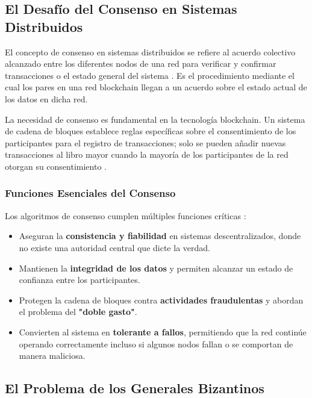 \documentclass[spanish,12pt,letterpaper]{report}
\begin{document}
\subsection{El Desafío del Consenso en Sistemas Distribuidos}

El concepto de consenso en sistemas distribuidos se refiere al acuerdo colectivo alcanzado entre los diferentes nodos de una red para verificar y confirmar transacciones o el estado general del sistema \parencite{crypto2025consensus}. Es el procedimiento mediante el cual los pares en una red blockchain llegan a un acuerdo sobre el estado actual de los datos en dicha red.

La necesidad de consenso es fundamental en la tecnología blockchain. Un sistema de cadena de bloques establece reglas específicas sobre el consentimiento de los participantes para el registro de transacciones; solo se pueden añadir nuevas transacciones al libro mayor cuando la mayoría de los participantes de la red otorgan su consentimiento \parencite{aws2025blockchain}.

\subsubsection{Funciones Esenciales del Consenso}

Los algoritmos de consenso cumplen múltiples funciones críticas \parencite{crypto2025consensus}:

\begin{itemize}
    \item Aseguran la \textbf{consistencia y fiabilidad} en sistemas descentralizados, donde no existe una autoridad central que dicte la verdad.
    \item Mantienen la \textbf{integridad de los datos} y permiten alcanzar un estado de confianza entre los participantes.
    \item Protegen la cadena de bloques contra \textbf{actividades fraudulentas} y abordan el problema del \textbf{"doble gasto"}.
    \item Convierten al sistema en \textbf{tolerante a fallos}, permitiendo que la red continúe operando correctamente incluso si algunos nodos fallan o se comportan de manera maliciosa.
\end{itemize}

\subsection{El Problema de los Generales Bizantinos}
\end{document}
